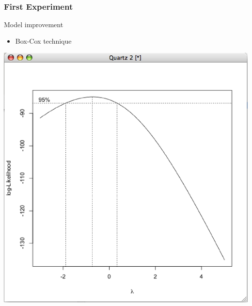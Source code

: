 \documentclass{beamer}
\begin{document}
\begin{frame}
\frametitle{First Experiment}

\begin{block}{Model improvement}
\begin{itemize}
\item Box-Cox technique
\end{itemize}
\end{block}

\begin{center}
 \includegraphics[scale=0.25]{images/fphase-boxcox.eps}
\end{center}

\end{frame}
\end{document}
